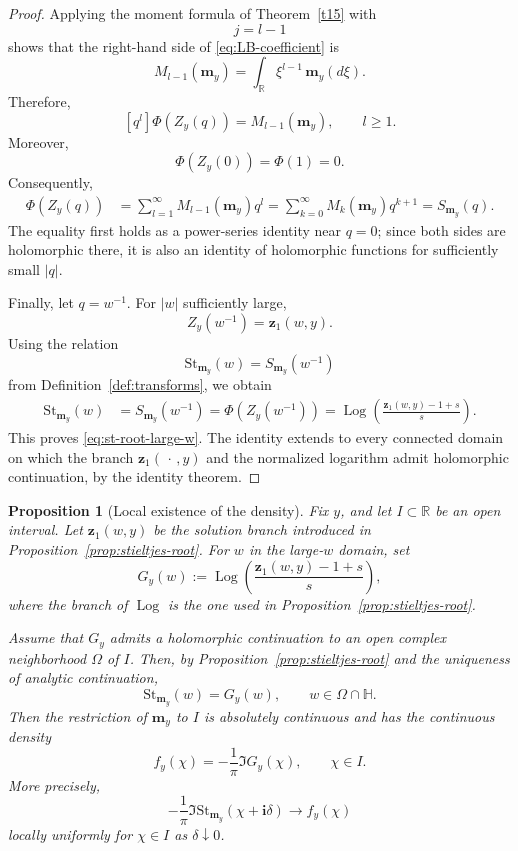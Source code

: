 \documentclass[11pt]{amsart}
\theoremstyle{plain}
\newtheorem{proposition}[theorem]{Proposition}
\renewcommand\ell{l}
\numberwithin{equation}{section}
\numberwithin{theorem}{section}
\numberwithin{figure}{section}
\begin{document}
\begin{proof}
Applying the moment formula of Theorem~\ref{t15} with
\[
    j=\ell-1
\]
shows that the right-hand side of
\eqref{eq:LB-coefficient} is
\[
    M_{\ell-1}(\mathbf m_y)
    =
    \int_{\mathbb R}
    \xi^{\ell-1}\,\mathbf m_y(d\xi).
\]
Therefore,
\[
    [q^\ell]\Phi(Z_y(q))
    =
    M_{\ell-1}(\mathbf m_y),
    \qquad \ell\geq1.
\]
Moreover,
\[
    \Phi(Z_y(0))
    =
    \Phi(1)
    =
    0.
\]
Consequently,
\begin{align*}
\Phi(Z_y(q))
&=
\sum_{\ell=1}^{\infty}
M_{\ell-1}(\mathbf m_y)q^\ell=
\sum_{k=0}^{\infty}
M_k(\mathbf m_y)q^{k+1}=
S_{\mathbf m_y}(q).
\end{align*}
The equality first holds as a power-series identity near \(q=0\);
since both sides are holomorphic there, it is also an identity of
holomorphic functions for sufficiently small \(|q|\).

Finally, let \(q=w^{-1}\). For \(|w|\) sufficiently large,
\[
    Z_y(w^{-1})
    =
    \mathbf z_1(w,y).
\]
Using the relation
\[
    \mathrm{St}_{\mathbf m_y}(w)
    =
    S_{\mathbf m_y}(w^{-1})
\]
from Definition~\ref{def:transforms}, we obtain
\begin{align*}
\mathrm{St}_{\mathbf m_y}(w)
&=
S_{\mathbf m_y}(w^{-1})=
\Phi(Z_y(w^{-1}))=
\operatorname{Log}\!
\left(
    \frac{\mathbf z_1(w,y)-1+s}{s}
\right).
\end{align*}
This proves \eqref{eq:st-root-large-w}. The identity extends to every
connected domain on which the branch
\(\mathbf z_1(\,\cdot\,,y)\) and the normalized logarithm admit
holomorphic continuation, by the identity theorem.
\end{proof}

\begin{proposition}[Local existence of the density]
\label{prop:density-existence}
Fix \(y\), and let \(I\subset\mathbb R\) be an open interval.
Let \(\mathbf z_1(w,y)\) be the solution branch introduced in
Proposition~\ref{prop:stieltjes-root}. For \(w\) in the large-\(w\)
domain, set
\[
    G_y(w)
    :=
    \operatorname{Log}\!\left(
        \frac{\mathbf z_1(w,y)-1+s}{s}
    \right),
\]
where the branch of \(\operatorname{Log}\) is the one used in
Proposition~\ref{prop:stieltjes-root}.

Assume that \(G_y\) admits a holomorphic continuation to an open
complex neighborhood \(\Omega\) of \(I\). Then, by
Proposition~\ref{prop:stieltjes-root} and the uniqueness of analytic
continuation,
\[
    \mathrm{St}_{\mathbf m_y}(w)=G_y(w),
    \qquad w\in\Omega\cap\mathbb H.
\]
Then the restriction of \(\mathbf m_y\) to \(I\) is absolutely
continuous and has the continuous density
\[
    f_y(\chi)
    =
    -\frac{1}{\pi}\Im G_y(\chi),
    \qquad \chi\in I.
\]
More precisely,
\[
    -\frac{1}{\pi}
    \Im\mathrm{St}_{\mathbf m_y}(\chi+\mathbf i\delta)
    \longrightarrow
    f_y(\chi)
\]
locally uniformly for \(\chi\in I\) as \(\delta\downarrow0\).
\end{proposition}
\end{document}
